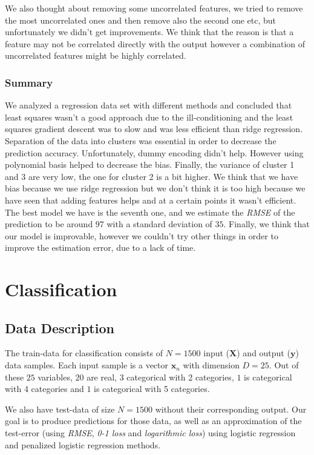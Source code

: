 \documentclass{article} %
\begin{document}
We also thought about removing some uncorrelated features, we tried to remove the most uncorrelated ones and then remove also the second one etc, but unfortunately we didn't get improvements. We think that the reason is that a feature may not be correlated directly with the output however a combination of uncorrelated features might be highly correlated. 

\subsubsection{Summary}

We analyzed a regression data set with different methods and concluded that least squares wasn't a good approach due to the ill-conditioning and the least squares gradient descent was to slow and was less efficient than ridge regression. Separation of the data into clusters was essential in order to decrease the prediction accuracy. Unfortunately, dummy encoding didn't help. However using polynomial basis helped to decrease the bias. Finally, the variance of cluster 1 and 3 are very low, the one for cluster 2 is a bit higher. We think that we have bias because we use ridge regression but we don't think it is too high because we have seen that adding features helps and at a certain points it wasn't efficient. The best model we have is the seventh one, and we estimate the \textit{RMSE} of the prediction to be around $97$ with a standard deviation of $35$. Finally, we think that our model is improvable, however we couldn't try other things in order to improve the estimation error, due to a lack of time.

\section{Classification}

\subsection{Data Description}

The train-data for classification consists of $N = 1500$ input ($\mathbf{X}$) and output ($\mathbf{y}$) data samples. Each input sample is a vector $\mathbf{x}_n$ with dimension $D = 25$. Out of these $25$ variables, $20$ are real, $3$ categorical with 2 categories, $1$ is categorical with 4 categories and $1$ is categorical with 5 categories.

We also have test-data of size $N=1500$ without their corresponding output. Our goal is to produce predictions for those data, as well as an approximation of the test-error (using \textit{RMSE}, \textit{0-1 loss} and \textit{logarithmic loss}) using logistic regression and penalized logistic regression methods.
\end{document}
